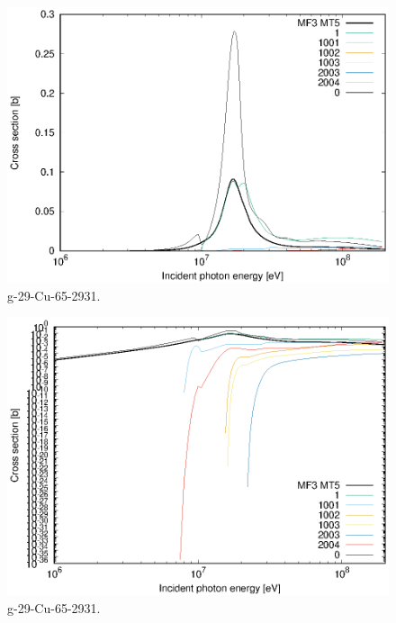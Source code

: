 \begin{figure}
 \includegraphics[width=\linewidth]{eps/g_29-Cu-65_2931.eps}
  \caption{g-29-Cu-65-2931.}
\end{figure}
\begin{figure}
 \includegraphics[width=\linewidth]{eps-log/g_29-Cu-65_2931.eps}
 \caption{g-29-Cu-65-2931.}
\end{figure}
\newpage \clearpage

